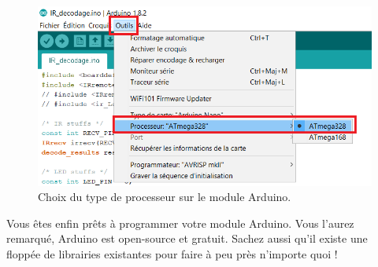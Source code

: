\begin{figure}[ht!]
	\centering
	\includegraphics[width=\textwidth]{imgs/arduino_processor_v2.png}
	\caption{Choix du type de processeur sur le module Arduino.}
	\label{fig:arduino_processor}
\end{figure}

Vous êtes enfin prêts à programmer votre module Arduino. Vous l'aurez remarqué, Arduino est open-source et gratuit. Sachez aussi qu'il existe une floppée de librairies existantes pour faire à peu près n'importe quoi !









